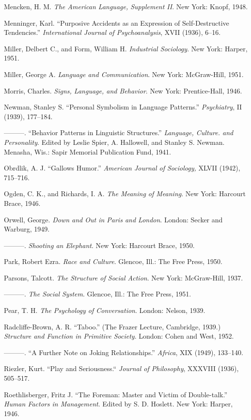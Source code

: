 \documentclass[openany,nobib]{tufte-book}
\begin{document}
\begin{hangparas}{.25in}{1}
Mencken, H. M. \emph{The American Language, Supplement II}. New York:
Knopf, 1948.

Menninger, Karl. ``Purposive Accidents as an Expression of
Self-Destructive Tendencies.'' \emph{International Journal of
Psychoanalysis}, XVII (1936), 6--16.

Miller, Delbert C., and Form, William H. \emph{Industrial Sociology}.
New York: Harper, 1951.

Miller, George A. \emph{Language and Communication}. New York:
McGraw-Hill, 1951.

Morris, Charles. \emph{Signs, Language, and Behavior}. New York:
Prentice-Hall, 1946.

Newman, Stanley S. ``Personal Symbolism in Language Patterns.''
\emph{Psychiatry}, II (1939), 177--184.

---------. ``Behavior Patterns in Linguistic Structures.''
\emph{Language, Culture. and Personality}. Edited by Leslie Spier, A.
Hallowell, and Stanley S. Newman. Menasha, Wis.: Sapir Memorial
Publication Fund, 1941.

Obrdlik, A. J. ``Gallows Humor.'' \emph{American Journal of Sociology,}
XLVII (1942), 715--716.

Ogden, C. K., and Richards, I. A. \emph{The Meaning of Meaning}. New
York: Harcourt Brace, 1946.

Orwell, George. \emph{Down and Out in Paris and London}. London: Secker
and Warburg, 1949.

---------. \emph{Shooting an Elephant}. New York: Harcourt Brace, 1950.

Park, Robert Ezra. \emph{Race and Culture}. Glencoe, Ill.: The Free
Press, 1950.

Parsons, Talcott. \emph{The Structure of Social Action}. New York:
McGraw-Hill, 1937.

---------. \emph{The Social System}. Glencoe, Ill.: The Free Press,
1951.

Pear, T. H. \emph{The Psychology of Conversation}. London: Nelson, 1939.

Radcliffe-Brown, A. R. ``Taboo.'' (The Frazer Lecture, Cambridge, 1939.)
\emph{Structure and Function in Primitive Society}. London: Cohen and
West, 1952.

---------. ``A Further Note on Joking Relationships.'' \emph{Africa},
XIX (1949), 133--140.

Riezler, Kurt. ``Play and Seriousness.`` \emph{Journal of Philosophy},
XXXVIII (1936), 505--517.

Roethlisberger, Fritz J. ``The Foreman: Master and Victim of
Double-talk.'' \emph{Human Factors in Management}. Edited by S. D.
Hoslett. New York: Harper, 1946.


\end{hangparas}
\end{document}
